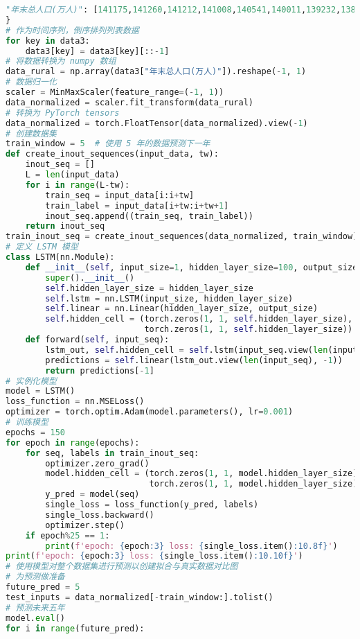 \begin{lstlisting}[language=python,caption={城乡人口}]
    "年末总人口(万人)": [141175,141260,141212,141008,140541,140011,139232,138326,137646,136726,135922,134916,134091,133450,132802,132129,131448,130756,129988,129227,128453,127627,126743,125786,124761,123626,122389,121121,119850,118517,117171,115823,114333],
}
# 作为时间序列，倒序排列列表数据
for key in data3:
    data3[key] = data3[key][::-1]
# 将数据转换为 numpy 数组
data_rural = np.array(data3["年末总人口(万人)"]).reshape(-1, 1)
# 数据归一化
scaler = MinMaxScaler(feature_range=(-1, 1))
data_normalized = scaler.fit_transform(data_rural)
# 转换为 PyTorch tensors
data_normalized = torch.FloatTensor(data_normalized).view(-1)
# 创建数据集
train_window = 5  # 使用 5 年的数据预测下一年
def create_inout_sequences(input_data, tw):
    inout_seq = []
    L = len(input_data)
    for i in range(L-tw):
        train_seq = input_data[i:i+tw]
        train_label = input_data[i+tw:i+tw+1]
        inout_seq.append((train_seq, train_label))
    return inout_seq
train_inout_seq = create_inout_sequences(data_normalized, train_window)
# 定义 LSTM 模型
class LSTM(nn.Module):
    def __init__(self, input_size=1, hidden_layer_size=100, output_size=1):
        super().__init__()
        self.hidden_layer_size = hidden_layer_size
        self.lstm = nn.LSTM(input_size, hidden_layer_size)
        self.linear = nn.Linear(hidden_layer_size, output_size)
        self.hidden_cell = (torch.zeros(1, 1, self.hidden_layer_size),
                            torch.zeros(1, 1, self.hidden_layer_size))
    def forward(self, input_seq):
        lstm_out, self.hidden_cell = self.lstm(input_seq.view(len(input_seq), 1, -1), self.hidden_cell)
        predictions = self.linear(lstm_out.view(len(input_seq), -1))
        return predictions[-1]
# 实例化模型
model = LSTM()
loss_function = nn.MSELoss()
optimizer = torch.optim.Adam(model.parameters(), lr=0.001)
# 训练模型
epochs = 150
for epoch in range(epochs):
    for seq, labels in train_inout_seq:
        optimizer.zero_grad()
        model.hidden_cell = (torch.zeros(1, 1, model.hidden_layer_size),
                             torch.zeros(1, 1, model.hidden_layer_size))
        y_pred = model(seq)
        single_loss = loss_function(y_pred, labels)
        single_loss.backward()
        optimizer.step()
    if epoch%25 == 1:
        print(f'epoch: {epoch:3} loss: {single_loss.item():10.8f}')
print(f'epoch: {epoch:3} loss: {single_loss.item():10.10f}')
# 使用模型对整个数据集进行预测以创建拟合与真实数据对比图
# 为预测做准备
future_pred = 5
test_inputs = data_normalized[-train_window:].tolist()
# 预测未来五年
model.eval()
for i in range(future_pred):

\end{lstlisting}
